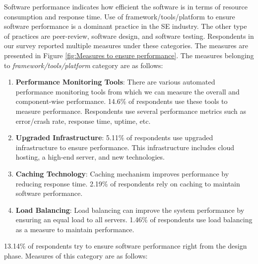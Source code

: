 Software performance indicates how efficient the software is in terms of resource consumption and response time. Use of framework/tools/platform to ensure software performance is a dominant practice in the SE industry. The other type of practices are peer-review, software design, and software testing. Respondents in our survey reported multiple measures under these categories.
The measures are presented in Figure \ref{fig:Measures to ensure performance}. The measures belonging to \emph{framework/tools/platform} category are as follows:
\begin{enumerate}[label=(\alph*)]

    
    \item \textbf{Performance Monitoring Tools}: There are various automated performance monitoring tools from which we can measure the overall and component-wise performance. 14.6\% of respondents use these tools to measure performance. Respondents use several performance metrics such as error/crash rate, response time, uptime, etc.
    
    \item \textbf{Upgraded Infrastructure}: 5.11\% of respondents use upgraded infrastructure to ensure performance. This infrastructure includes cloud hosting, a high-end server, and new technologies.
    
    \item \textbf{Caching Technology}: Caching mechanism improves performance by reducing response time. 2.19\% of respondents rely on caching to maintain software performance.
    
    \item \textbf{Load Balancing}: Load balancing can improve the system performance by ensuring an equal load to all servers. 1.46\% of respondents use load balancing as a measure to maintain performance.

\end{enumerate}


13.14\% of respondents try to ensure software performance right from the design phase. Measures of this category are as follows:

